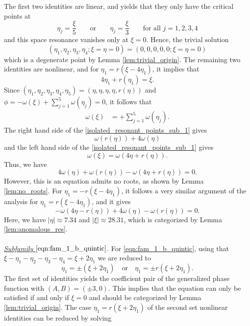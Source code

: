 \documentclass[reqno,english,11pt]{amsart}
\theoremstyle{definition}
\numberwithin{equation}{section}
\begin{document}
The first two identities are linear, and yields that they only have the critical points at $$\eta_j=\frac{\xi}{5} \qquad\text{or}\qquad \eta_j=\frac{\xi}{3}\qquad \text{for all }j=1,2,3,4$$ and this space resonance vanishes only at $\xi=0$. Hence, the trivial solution $$(\eta_1,\eta_2,\eta_3,\eta_4;\xi=\eta=0)=(0,0,0,0,0;\xi=\eta=0)$$
which is a degenerate point  by Lemma \ref{lem:trivial_origin}. The remaining two identities are nonlinear, and for $\eta_1=r(\xi-4\eta_1)$, it implies that
$$4\eta_1+r(\eta_1)=\xi.$$
Since $(\eta_1,\eta_2,\eta_3,\eta_4,\eta_5)=(\eta,\eta,\eta,\eta,r(\eta))$ and $ \phi=-\omega(\xi)+\sum^5_{j=1}\omega(\eta_j)=0$, it follows that
\begin{align}\label{isolated_resonant_points_sub_1}
    \omega(\xi)&=+\sum^5_{j=1}\omega(\eta_j).
\end{align}
The right hand side of the \eqref{isolated_resonant_points_sub_1} gives
$$\omega(r(\eta))+4\omega(\eta)$$
and the left hand side of the \eqref{isolated_resonant_points_sub_1} gives
$$\omega(\xi)=\omega(4\eta+r(\eta)).$$
Thus, we have
\begin{equation}
4\omega(\eta)+\omega(r(\eta))-\omega(4\eta+r(\eta))=0.
\end{equation}
However, this is an equation admits no roots, as shown by Lemma \ref{lem:no_roots}.
For $\eta_1=-r(\xi-4\eta_1)$, it follows a very similar argument of the analysis for $\eta_1=r(\xi-4\eta_1)$, and it gives 
\begin{equation}\label{isolated_resonant_points_sub_2}
    -\omega(4\eta-r(\eta))+4\omega(\eta)-\omega(r(\eta))=0.
\end{equation}
Here, we have $\vert \eta\vert \approx 7.34$ and $\vert \xi\vert\approx 28.31$, which is categorized by Lemma \ref{lem:anomalous_res}.
\\\\
\noindent
{\it \underline{Subfamily $\eqref{eqn:fam_1_b_quintic}$}}.
For \eqref{eqn:fam_1_b_quintic}, using that $\xi-\eta_1-\eta_2-\eta_3-\eta_4=\xi+2\eta_1$ we are reduced to
\begin{equation}\label{eq:eta1_reduced_2}
\eta_1 = \pm(\xi+2\eta_1)
\quad\text{or}\quad
\eta_1 = \pm r(\xi+2\eta_1).
\end{equation}
The first set of identities yields the coefficient pair of the generalized phase function with $(A,B)=(\pm 3,0)$. This implies that the equation can only be satisfied if and only if $\xi=0$ and should be categorized by Lemma \ref{lem:trivial_origin}. The case $\eta_1= r(\xi+2\eta_1)$ of the second set nonlinear identities can be reduced by solving
\end{document}
